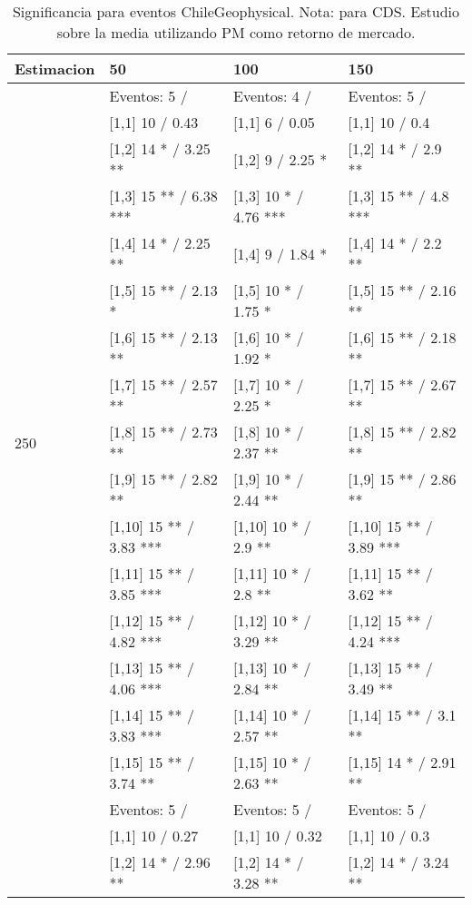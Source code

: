 \begin{table}

\caption{Significancia para eventos ChileGeophysical. Nota: para CDS. Estudio sobre la media utilizando PM como retorno de mercado.}
\centering
\begin{tabular}[t]{llll}
\toprule
Estimacion & 50 & 100 & 150\\
\midrule
 & Eventos:  5 / & Eventos:  4 / & Eventos:  5 /\\
 & {}[1,1] 10  / 0.43 & {}[1,1] 6  / 0.05 & {}[1,1] 10  / 0.4\\
 & {}[1,2] 14 * / 3.25 ** & {}[1,2] 9  / 2.25 * & {}[1,2] 14 * / 2.9 **\\
 & {}[1,3] 15 ** / 6.38 *** & {}[1,3] 10 * / 4.76 *** & {}[1,3] 15 ** / 4.8 ***\\
 & {}[1,4] 14 * / 2.25 ** & {}[1,4] 9  / 1.84 * & {}[1,4] 14 * / 2.2 **\\
\addlinespace
 & {}[1,5] 15 ** / 2.13 * & {}[1,5] 10 * / 1.75 * & {}[1,5] 15 ** / 2.16 **\\
 & {}[1,6] 15 ** / 2.13 ** & {}[1,6] 10 * / 1.92 * & {}[1,6] 15 ** / 2.18 **\\
 & {}[1,7] 15 ** / 2.57 ** & {}[1,7] 10 * / 2.25 * & {}[1,7] 15 ** / 2.67 **\\
250 & {}[1,8] 15 ** / 2.73 ** & {}[1,8] 10 * / 2.37 ** & {}[1,8] 15 ** / 2.82 **\\
 & {}[1,9] 15 ** / 2.82 ** & {}[1,9] 10 * / 2.44 ** & {}[1,9] 15 ** / 2.86 **\\
\addlinespace
 & {}[1,10] 15 ** / 3.83 *** & {}[1,10] 10 * / 2.9 ** & {}[1,10] 15 ** / 3.89 ***\\
 & {}[1,11] 15 ** / 3.85 *** & {}[1,11] 10 * / 2.8 ** & {}[1,11] 15 ** / 3.62 **\\
 & {}[1,12] 15 ** / 4.82 *** & {}[1,12] 10 * / 3.29 ** & {}[1,12] 15 ** / 4.24 ***\\
 & {}[1,13] 15 ** / 4.06 *** & {}[1,13] 10 * / 2.84 ** & {}[1,13] 15 ** / 3.49 **\\
 & {}[1,14] 15 ** / 3.83 *** & {}[1,14] 10 * / 2.57 ** & {}[1,14] 15 ** / 3.1 **\\
\addlinespace
 & {}[1,15] 15 ** / 3.74 ** & {}[1,15] 10 * / 2.63 ** & {}[1,15] 14 * / 2.91 **\\
 & Eventos:  5 / & Eventos:  5 / & Eventos:  5 /\\
 & {}[1,1] 10  / 0.27 & {}[1,1] 10  / 0.32 & {}[1,1] 10  / 0.3\\
 & {}[1,2] 14 * / 2.96 ** & {}[1,2] 14 * / 3.28 ** & {}[1,2] 14 * / 3.24 **\\

\end{tabular}
\end{table}
